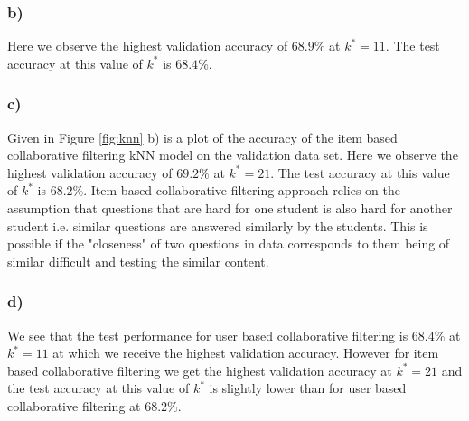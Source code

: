 \documentclass{article}
\begin{document}
\subsubsection*{b)}
Here we observe the highest validation accuracy of $68.9\%$ at $k^*=11$. The test accuracy at this value of $k^*$ is $68.4\%$. 

\subsubsection*{c)}
Given in Figure \ref{fig:knn} b) is a plot of the accuracy of the item based collaborative filtering kNN model on the validation data set. Here we observe the highest validation accuracy of $69.2\%$ at $k^*=21$. The test accuracy at this value of $k^*$ is $68.2\%$. Item-based collaborative filtering approach relies on the assumption that questions that are hard for one student is also hard for another student i.e. similar questions are answered similarly by the students. This is possible if the "closeness" of two questions in data corresponds to them being of similar difficult and testing the similar content. 

\subsubsection*{d)}
We see that the test performance for user based collaborative filtering is $68.4\%$ at $k^*=11$ at which we receive the highest validation accuracy. However for item based collaborative filtering we get the highest validation accuracy at $k^*=21$ and the test accuracy at this value of $k^*$ is slightly lower than for user based collaborative filtering at $68.2\%$.
\end{document}
